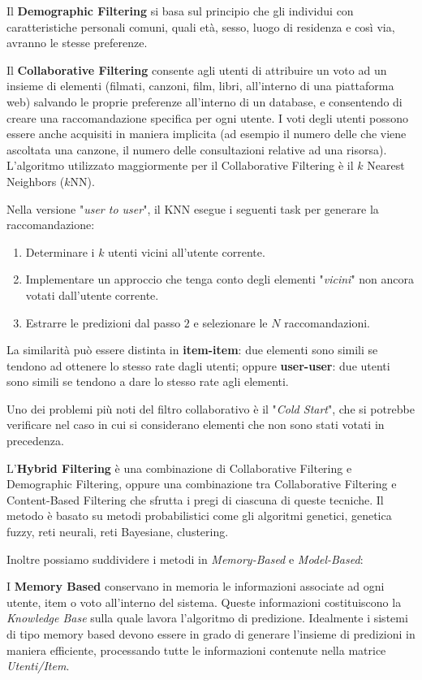 \documentclass[12pt]{article}
\begin{document}
Il \textbf{Demographic Filtering} si basa sul principio che gli individui con caratteristiche personali comuni, quali età, sesso, luogo di residenza e così via, avranno le stesse preferenze.

Il \textbf{Collaborative Filtering} consente agli utenti di attribuire un voto ad un insieme di elementi (filmati, canzoni, film, libri, all'interno di una piattaforma web) salvando le proprie preferenze all'interno di un database, e consentendo di creare una raccomandazione specifica per ogni utente. I voti degli utenti possono essere anche acquisiti in maniera implicita (ad esempio il numero delle che viene ascoltata una canzone, il numero delle consultazioni relative ad una risorsa). L'algoritmo utilizzato maggiormente per il Collaborative Filtering è il $k$ Nearest Neighbors ($k$NN). 

Nella versione "\textit{user to user}", il KNN esegue i seguenti task per generare la raccomandazione:
\begin{enumerate}
\item Determinare i $k$ utenti vicini all'utente corrente.
\item Implementare un approccio che tenga conto degli elementi "\textit{vicini}" non ancora votati dall'utente corrente.
\item Estrarre le predizioni dal passo $2$ e selezionare le $N$ raccomandazioni.
\end{enumerate}

La similarità può essere distinta in \textbf{item-item}: due elementi sono simili se tendono ad ottenere lo stesso rate dagli utenti; oppure \textbf{user-user}: due utenti sono simili se tendono a dare lo stesso rate agli elementi.

Uno dei problemi più noti del filtro collaborativo è il "\textit{Cold Start}", che si potrebbe verificare nel caso in cui si considerano elementi che non sono stati votati in precedenza.

L'\textbf{Hybrid Filtering} è una combinazione di Collaborative Filtering e Demographic Filtering, oppure una combinazione tra Collaborative Filtering e Content-Based Filtering che sfrutta i pregi di ciascuna di queste tecniche. Il metodo è basato su metodi probabilistici come gli algoritmi genetici, genetica fuzzy, reti neurali, reti Bayesiane, clustering.

Inoltre possiamo suddividere i metodi in \textit{Memory-Based} e \textit{Model-Based}:

I \textbf{Memory Based} conservano in memoria le informazioni associate ad ogni utente, item o voto all'interno del sistema. Queste informazioni costituiscono la \textit{Knowledge Base} sulla quale lavora l'algoritmo di predizione. Idealmente i sistemi di tipo memory based devono essere in grado di generare l'insieme di predizioni in maniera efficiente, processando tutte le informazioni contenute nella matrice
\textit{Utenti/Item}.
\end{document}
